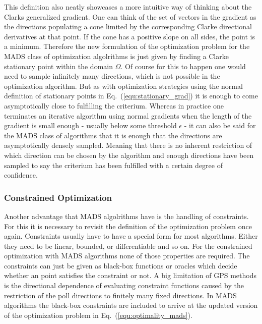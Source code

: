 \documentclass[a4paper,10pt]{article}
\newcommand{\equref}[1]{Eq.~(\ref{#1})}
\begin{document}
    This definition also neatly showcases a more intuitive way of thinking
    about the Clarks generalized gradient.
    One can think of the set of vectors in the gradient as the directions
    populating a cone limited by the corresponding Clarke directional
    derivatives at that point.
    If the cone has a positive slope on all sides, the point is a minimum.
    Therefore the new formulation of the optimization problem for
    the MADS class of optimization algolrithms is just given by finding
    a Clarke stationary point within the domain $\Omega$.
    Of course for this to happen one would need to sample infinitely
    many directions, which is not possible in the optimization
    algorithm.
    But as with optimization strategies using the normal 
    definition of stationary points in \equref{equ:stationary_grad} it
    is enough to come asymptotically close to fulfilling the
    criterium.
    Whereas in practice one terminates an iterative algorithm using
    normal gradients when the length of the gradient is small
    enough - usually below some threshold $\epsilon$ - it can
    also be said for the MADS class of algorithms that it is
    enough that the directions are asymptotically densely
    sampled.
    Meaning that there is no inherent restriction of which direction
    can be chosen by the algorithm and enough directions have been sampled
    to say the criterium has been fulfilled with a certain degree of
    confidence. 

    \subsubsection{Constrained Optimization}

    Another advantage that MADS algolrithms have is the handling of
    constraints.
    For this it is necessary to revisit the definition of the optimization
    problem once again.
    Constraints usually have to have a special form for most algorithms.
    Either they need to be linear, bounded, or differentiable and so on.
    For the constrained optimization with MADS algorithms none of
    those properties are required.
    The constraints can just be given as black-box functions or
    oracles which decide whether an point satisfies the constraint
    or not.
    A big limitation of GPS methods is the directional dependence of
    evaluating constraint functions caused by the restriction of the poll
    directions to finitely many fixed directions.
    In MADS algorithms the black-box constraints are included to arrive
    at the updated version of the optimization problem in
    \equref{equ:optimality_mads}.
\end{document}
